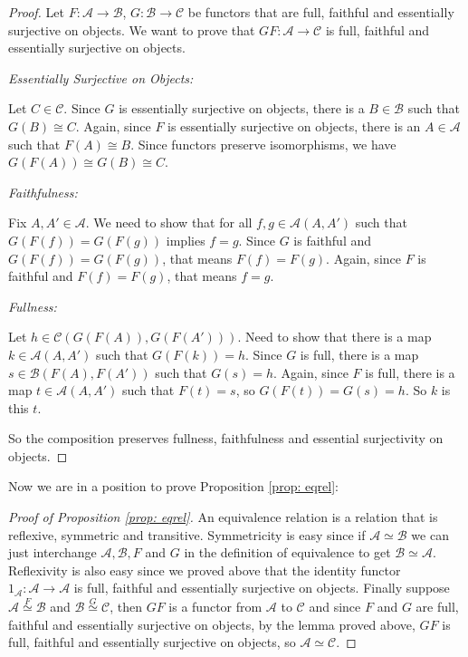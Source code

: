 \documentclass[11pt]{article}
\theoremstyle{definition}
\theoremstyle{plain}
\theoremstyle{plain}
\theoremstyle{plain}
\begin{document}
\begin{proof}
Let $F:\mathscr{A}\to\mathscr{B}$, $G:\mathscr{B}\to\mathscr{C}$ be functors that are full, faithful and essentially surjective on objects. We want to prove that $GF:\mathscr{A}\to\mathscr{C}$ is full, faithful and essentially surjective on objects.

\emph{Essentially Surjective on Objects:}

Let $C\in\mathscr{C}$. Since $G$ is essentially surjective on objects, there is a $B\in\mathscr{B}$ such that $G(B) \cong C$. Again, since $F$ is essentially surjective on objects, there is an $A\in\mathscr{A}$ such that $F(A) \cong B$. Since functors preserve isomorphisms, we have $G(F(A)) \cong G(B) \cong C$.

\emph{Faithfulness:}

Fix $A,A'\in\mathscr{A}$. We need to show that for all $f,g \in \mathscr{A}(A,A')$ such that $G(F(f))=G(F(g))$ implies $f=g$. Since $G$ is faithful and $G(F(f))=G(F(g))$, that means $F(f)=F(g)$. Again, since $F$ is faithful and $F(f)=F(g)$, that means $f=g$.

\emph{Fullness:}

Let $h \in \mathscr{C}(G(F(A)), G(F(A')))$. Need to show that there is a map $k \in \mathscr{A}(A,A')$ such that $G(F(k)) = h$. Since $G$ is full, there is a map $s \in \mathscr{B}(F(A), F(A'))$ such that $G(s)=h$. Again, since $F$ is full, there is a map $t \in \mathscr{A}(A, A')$ such that $F(t)=s$, so $G(F(t))=G(s)=h$. So $k$ is this $t$.

So the composition preserves fullness, faithfulness and essential surjectivity on objects.
\end{proof}

Now we are in a position to prove Proposition \ref{prop: eqrel}:

\begin{proof}[Proof of Proposition \ref{prop: eqrel}]
An equivalence relation is a relation that is reflexive, symmetric and transitive. Symmetricity is easy since if $\mathscr{A}\simeq\mathscr{B}$ we can just interchange $\mathscr{A},\mathscr{B},F$ and $G$ in the definition of equivalence to get $\mathscr{B}\simeq\mathscr{A}$. Reflexivity is also easy since we proved above that the identity functor $1_{\mathscr{A}}:\mathscr{A}\to\mathscr{A}$ is full, faithful and essentially surjective on objects. Finally suppose $\mathscr{A}\overset{F}{\simeq}\mathscr{B}$ and $\mathscr{B}\overset{G}{\simeq}\mathscr{C}$, then $GF$ is a functor from $\mathscr{A}$ to $\mathscr{C}$ and since $F$ and $G$ are full, faithful and essentially surjective on objects, by the lemma proved above, $GF$ is full, faithful and essentially surjective on objects, so $\mathscr{A}\simeq\mathscr{C}$.
\end{proof}

\nocite{*}


\end{document}
